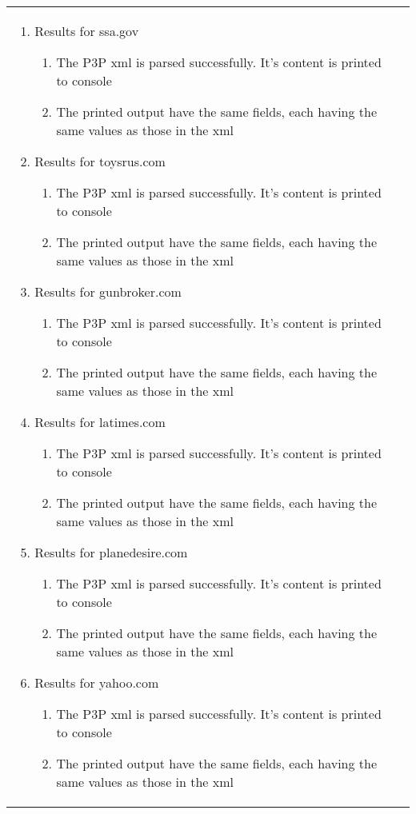 \documentclass[10pt]{article}
\begin{document}
\begin{center}
\begin{longtable}{ | p{4cm} | p{10cm} | }
\begin{enumerate}
							\item Results for ssa.gov
							\begin{enumerate}
								\item The P3P xml is parsed successfully. It's content is printed to console
								\item The printed output have the same fields, each having the same values as those in the xml
							\end{enumerate}

							\item Results for toysrus.com
							\begin{enumerate}
								\item The P3P xml is parsed successfully. It's content is printed to console
								\item The printed output have the same fields, each having the same values as those in the xml
							\end{enumerate}
							
							\item Results for gunbroker.com
							\begin{enumerate}
								\item The P3P xml is parsed successfully. It's content is printed to console
								\item The printed output have the same fields, each having the same values as those in the xml
							\end{enumerate}

							\item Results for latimes.com
							\begin{enumerate}
								\item The P3P xml is parsed successfully. It's content is printed to console
								\item The printed output have the same fields, each having the same values as those in the xml
							\end{enumerate}

							\item Results for planedesire.com
							\begin{enumerate}
								\item The P3P xml is parsed successfully. It's content is printed to console
								\item The printed output have the same fields, each having the same values as those in the xml
							\end{enumerate}

							\item Results for yahoo.com
							\begin{enumerate}
								\item The P3P xml is parsed successfully. It's content is printed to console
								\item The printed output have the same fields, each having the same values as those in the xml
							\end{enumerate}


\end{enumerate}
\end{longtable}
\end{center}
\end{document}
